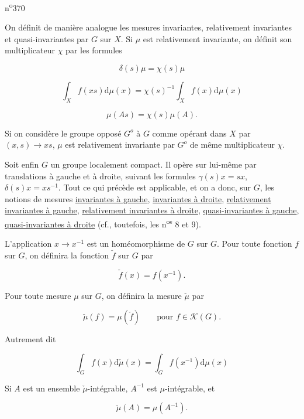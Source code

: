  \hfill n\textsuperscript{o}370

On définit de manière analogue les mesures invariantes, relativement invariantes et quasi-invariantes par $G$ sur $X$. Si $\mu$ est relativement invariante, on définit son multiplicateur $\chi$ par les formules

\[
\delta(s)\mu=\chi(s)\mu \tag*{(7')}
\]

\[
\int_X f(xs)\mathrm{d}\mu(x)=\chi(s)^{-1}\int_X f(x)\mathrm{d}\mu(x) \tag*{(8')}
\]

\[
\mu(As)=\chi(s)\mu(A). \tag*{(9')}
\]

Si on considère le groupe opposé $G^o$ à $G$ comme opérant dans $X$ par $(x,s)\to xs$, $\mu$ est relativement invariante par $G^o$ de même multiplicateur $\chi$.

Soit enfin $G$ un groupe localement compact. Il opère sur lui-même par translations à gauche et à droite, suivant les formules $\gamma(s)x=sx$, $\delta(s)x=xs^{-1}$. Tout ce qui précède est applicable, et on a donc, sur $G$, les notions de mesures \uline{invariantes à gauche}, \uline{invariantes à droite}, \uline{relativement invariantes à gauche}, \uline{relativement invariantes à droite}, \uline{quasi-invariantes à gauche}, \uline{quasi-invariantes à droite} (cf., toutefois, les n\textsuperscript{os} 8 et 9).

L'application $x\to x^{-1}$ est un homéomorphisme de $G$ sur $G$. Pour toute fonction $f$ sur $G$, on définira la fonction $\check f$ sur $G$ par

\[
\check f(x)=f(x^{-1}). \tag*{(10)}
\]

Pour toute mesure $\mu$ sur $G$, on définira la mesure $\check\mu$ par

\[
\check\mu(f)=\mu(\check f)\qquad\text{pour }f\in\mathcal{K}(G). \tag*{(11)}
\]

Autrement dit

\[
\int_G f(x)\mathrm{d}\check\mu(x)=\int_G f(x^{-1})\mathrm{d}\mu(x) \tag*{(12)}
\]

Si $A$ est un ensemble $\check\mu$-intégrable, $A^{-1}$ est $\mu$-intégrable, et

\[
\check\mu(A)=\mu(A^{-1}). \tag*{(13)}
\]
